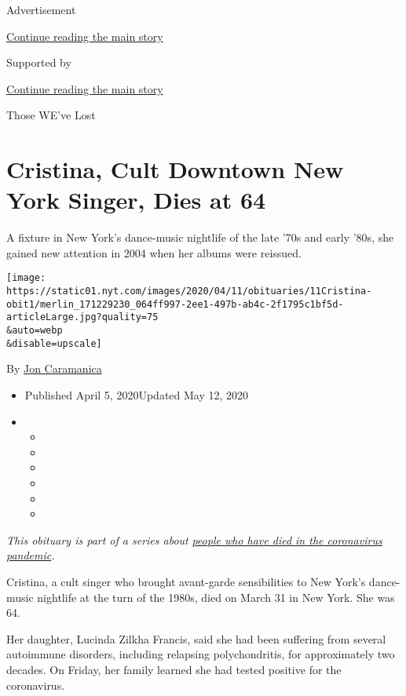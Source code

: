 Advertisement

\protect\hyperlink{after-top}{Continue reading the main story}

Supported by

\protect\hyperlink{after-sponsor}{Continue reading the main story}

Those WE've Lost

\hypertarget{cristina-cult-downtown-new-york-singer-dies-at-64}{%
\section{Cristina, Cult Downtown New York Singer, Dies at
64}\label{cristina-cult-downtown-new-york-singer-dies-at-64}}

A fixture in New York's dance-music nightlife of the late '70s and early
'80s, she gained new attention in 2004 when her albums were reissued.

\texttt{[image: https://static01.nyt.com/images/2020/04/11/obituaries/11Cristina-obit1/merlin\_171229230\_064ff997-2ee1-497b-ab4c-2f1795c1bf5d-articleLarge.jpg?quality=75\\\&auto=webp\\\&disable=upscale]}

By \href{https://www.nytimes.com/by/jon-caramanica}{Jon Caramanica}

\begin{itemize}
\item
  Published April 5, 2020Updated May 12, 2020
\item
  \begin{itemize}
  \item
  \item
  \item
  \item
  \item
  \item
  \end{itemize}
\end{itemize}

\emph{This obituary is part of a series about}
\href{https://www.nytimes.com/series/people-who-have-died-of-the-coronavirus}{\emph{people
who have died in the coronavirus pandemic}}\emph{.}

Cristina, a cult singer who brought avant-garde sensibilities to New
York's dance-music nightlife at the turn of the 1980s, died on March 31
in New York. She was 64.

Her daughter, Lucinda Zilkha Francis, said she had been suffering from
several autoimmune disorders, including relapsing polychondritis, for
approximately two decades. On Friday, her family learned she had tested
positive for the coronavirus.

